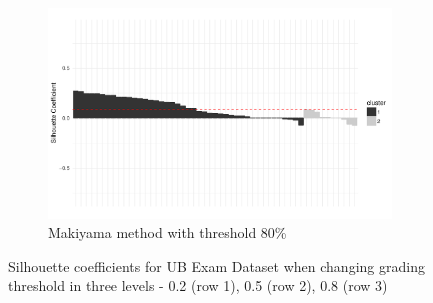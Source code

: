 \begin{figure}[h!]
\begin{subfigure}[b]{0.322\textwidth}
        \includegraphics[width=\textwidth]{graphics/sil_ub_makiyama_0.8.pdf}
        \caption{Makiyama method with threshold 80\%}
    \end{subfigure}
    \caption{Silhouette coefficients for UB Exam Dataset when changing grading threshold in three levels - 0.2 (row 1), 0.5 (row 2), 0.8 (row 3)}
    \label{fig:sil_ub_threshold}
\end{figure}


